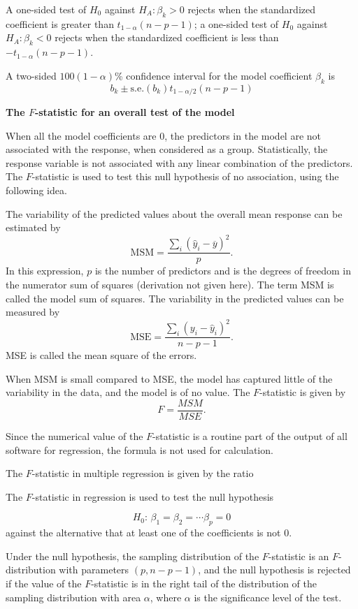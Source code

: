 A one-sided test of $H_0$ against $H_A: \beta_k > 0$  rejects when the standardized coefficient is greater than  $t_{1 - \alpha}(n - p - 1)$; a one-sided test of $H_0$ against $H_A: \beta_k < 0$  rejects when the standardized coefficient is less than $-t_{1 - \alpha}(n - p - 1)$.

\begin{termBox}{
A two-sided $100(1 - \alpha)$\% confidence interval for the model coefficient $\beta_k$ is 
\[
     b_k \pm {\textrm{s.e.}(b_k)} t_{1 - \alpha/2}(n - p - 1)
\]}
\end{termBox}


\textbf{The $F$-statistic for an overall test of the model}

When all the model coefficients are 0, the predictors in the model are not associated with the response, when considered as a group.  Statistically, the response variable is not associated with any linear combination of the predictors. The $F$-statistic is used to test this null hypothesis of no association, using the following idea.  

The variability of the predicted values about the overall mean response can be estimated by
\[
   \text{MSM} =  \frac{\sum_i(\hat{y}_i - \overline{y})^2}{p}.
\]
In this expression, $p$ is the number of predictors and is the degrees of freedom in the numerator sum of squares (derivation not given here).  The term MSM is called the model sum of squares.  The variability in the predicted values can be measured by 
\[
  \text{MSE} = \frac{\sum_i(y_i - \hat{y}_i)^2}{n - p - 1}.
\]
MSE is called the mean square of the errors.

When MSM is small compared to MSE, the model has captured little of the variability in the data, and the model is of no value.  The $F$-statistic is given by
\[
   F = \frac{MSM}{MSE}.
\]

Since the numerical value of the $F$-statistic is a routine part of the output of all software for regression, the formula is not used for calculation.

\begin{termBox}{
The $F$-statistic in multiple regression is given by the ratio

The $F$-statistic in regression is used to test the null hypothesis 

\[
  H_0:\, \beta_1 = \beta_2 = \cdots \beta_p = 0
\]
against the alternative that at least one of the coefficients is not 0.

Under the null hypothesis, the sampling distribution of the $F$-statistic is an $F$-distribution with parameters $(p, n - p - 1)$, and the null hypothesis is rejected if the value of the $F$-statistic is in the right tail of the distribution of the sampling distribution with area $\alpha$, where $\alpha$ is the significance level of the test.}
\end{termBox}

